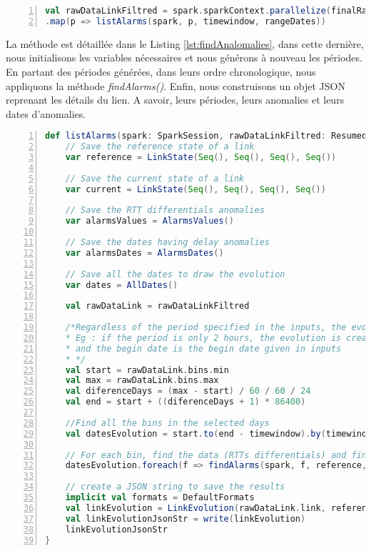 \begin{lstlisting}[language=scala,firstnumber=1, caption={Définition de la classe ResumedLink},label={lst:paralelizeAndDtectAnomalies}, basicstyle = \footnotesize,escapechar=|,numbers=left,
stepnumber=1]
val rawDataLinkFiltred = spark.sparkContext.parallelize(finalRawRttDiff.toSeq)
.map(p => listAlarms(spark, p, timewindow, rangeDates))
\end{lstlisting}

La méthode est détaillée dans le Listing \ref{lst:findAnalomalies}, dans cette dernière, nous initialisons les variables nécessaires et nous générons à nouveau les périodes. En partant des périodes générées, dans leurs ordre chronologique, nous appliquons la méthode \textit{findAlarms()}. Enfin, nous construisons un objet JSON reprenant les détails du lien. A savoir, leurs périodes, leurs anomalies et leurs dates d'anomalies.
\begin{lstlisting}[language=scala,firstnumber=1, caption={Définition de la classe ResumedLink},label={lst:findAnalomalies}, basicstyle = \footnotesize,escapechar=|,numbers=left,
stepnumber=1]
  def listAlarms(spark: SparkSession, rawDataLinkFiltred: ResumedLink, timewindow: Int, rangeDates: Seq[Int]): String = {
	// Save the reference state of a link
	var reference = LinkState(Seq(), Seq(), Seq(), Seq())
	
	// Save the current state of a link
	var current = LinkState(Seq(), Seq(), Seq(), Seq())
	
	// Save the RTT differentials anomalies
	var alarmsValues = AlarmsValues()
	
	// Save the dates having delay anomalies
	var alarmsDates = AlarmsDates()
	
	// Save all the dates to draw the evolution 
	var dates = AllDates()
	
	val rawDataLink = rawDataLinkFiltred
	
	/*Regardless of the period specified in the inputs, the evolution is created for one or more days
	* Eg : if the period is only 2 hours, the evolution is created for 24 hours,
	* and the begin date is the begin date given in inputs
	* */
	val start = rawDataLink.bins.min
	val max = rawDataLink.bins.max
	val diferenceDays = (max - start) / 60 / 60 / 24
	val end = start + ((diferenceDays + 1) * 86400)
	
	//Find all the bins in the selected days
	val datesEvolution = start.to(end - timewindow).by(timewindow)
	
	// For each bin, find the data (RTTs differentials) and find alarms
	datesEvolution.foreach(f => findAlarms(spark, f, reference, rawDataLink, current, alarmsDates, alarmsValues, dates))
	
	// create a JSON string to save the results
	implicit val formats = DefaultFormats
	val linkEvolution = LinkEvolution(rawDataLink.link, reference, current, alarmsDates.dates, alarmsValues.medians, dates.dates)
	val linkEvolutionJsonStr = write(linkEvolution)
	linkEvolutionJsonStr
}
\end{lstlisting}

